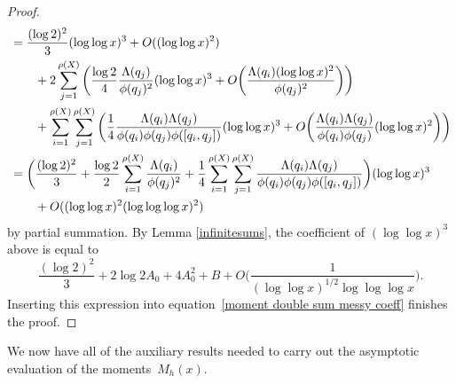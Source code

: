 \documentclass[12pt,reqno]{amsart}
\theoremstyle{definition}
\begin{document}
\begin{proof}
\begin{align}
&= \frac{(\log 2)^2}{3}(\log\log x)^3 + O((\log\log x)^2) \nonumber \\
&\qquad{}+ 2\sum_{j = 1}^{\rho(X)} \bigg( \frac{\log 2}{4}\frac{\Lambda(q_j)}{\phi(q_j)^2}(\log\log x)^3 + O\bigg(\frac{\Lambda(q_i)(\log\log x)^2}{\phi(q_j)^2}\bigg) \bigg) \nonumber \\
&\qquad{}+ \sum_{i = 1}^{\rho(X)} \sum_{j = 1}^{\rho(X)} \bigg( \frac{1}{4}\frac{\Lambda(q_i)\Lambda(q_j)}{\phi(q_i)\phi(q_j)\phi([q_i, q_j])}(\log\log x)^3 + O\bigg(\frac{\Lambda(q_i)\Lambda(q_j)}{\phi(q_i)\phi(q_j)}(\log\log x)^2\bigg)\bigg) \notag \\
&= \bigg( \frac{(\log 2)^2}{3} + \frac{\log 2}{2} \sum_{i = 1}^{\rho(X)} \frac{\Lambda(q_i)}{\phi(q_j)^2} + \frac{1}{4} \sum_{i = 1}^{\rho(X)} \sum_{j = 1}^{\rho(X)} \frac{\Lambda(q_i)\Lambda(q_j)}{\phi(q_i)\phi(q_j)\phi([q_i, q_j])} \bigg) (\log\log x)^3 \notag \\
&\qquad{}+ O((\log\log x)^2(\log\log\log x)^2)
\label{moment double sum messy coeff}
\end{align}
by partial summation.
By Lemma \ref{infinitesums}, the coefficient of $(\log\log x)^3$ above is equal to
\[
\frac{(\log 2)^2}{3} + 2\log 2 A_0 + 4A_0^2 + B + O\bigg( \frac{1}{(\log\log x)^{1/2}\log\log\log x} \bigg).
\]
Inserting this expression into equation~\eqref{moment double sum messy coeff} finishes the proof.
\end{proof}

We now have all of the auxiliary results needed to carry out the asymptotic evaluation of the moments~$M_h(x)$.
\end{document}
